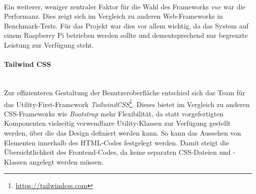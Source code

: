 \documentclass[10pt, a4paper]{article}
\begin{document}
\begin{onehalfspace}
  \paragraph*{}
  Ein weiterer, weniger zentraler Faktor für die Wahl des Frameworks \textit{vue} war die Performanz.
  Dies zeigt sich im Vergleich zu anderen Web-Frameworks in Benchmark-Tests.\cite{Vue_Performance}
  Für das Projekt war dies vor allem wichtig, da das System auf einem Raspberry Pi betrieben werden sollte
  und dementsprechend nur begrenzte Leistung zur Verfügung steht.

  \paragraph*{Tailwind CSS} $~$ \\
  Zur effizienteren Gestaltung der Benutzeroberfläche entschied sich das Team für das Utility-First-Framework \textit{TailwindCSS}\footnote{\raggedright\url{https://tailwindcss.com}}.
  Dieses bietet im Vergleich zu anderen CSS-Frameworks wie \textit{Bootstrap} mehr Flexibilität, da statt vorgefertigten Komponenten vielseitig verwendbare Utility-Klassen zur Verfügung gestellt werden,
  über die das Design definiert werden kann. So kann das Aussehen von Elementen innerhalb des HTML-Codes festgelegt werden.
  Damit steigt die Übersichtlichkeit des Frontend-Codes, da keine separaten CSS-Dateien und -Klassen angelegt werden müssen.
  \cite{Tailwind_Vorteile}



\end{onehalfspace}
\end{document}
